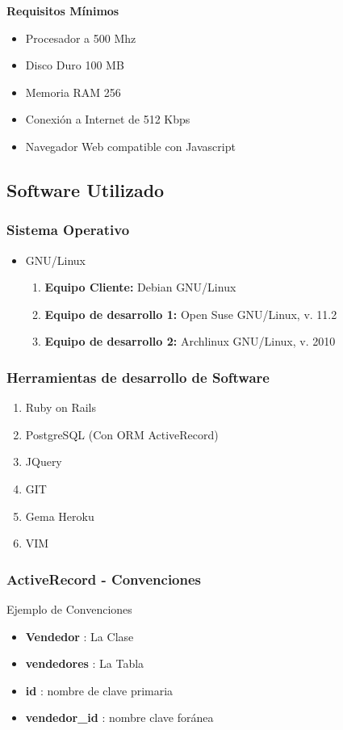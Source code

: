\documentclass{beamer}
\begin{document}
\begin{frame}
\textbf{Requisitos Mínimos}
\begin{itemize}
\item Procesador a 500 Mhz
\item Disco Duro 100 MB
\item Memoria RAM 256
\item Conexión a Internet de 512 Kbps 
\item Navegador Web compatible con Javascript
\end{itemize}
\end{frame}

\subsection{Software Utilizado}

\begin{frame}
\frametitle{Sistema Operativo}
\begin{itemize}
\item GNU/Linux
\begin{enumerate}
\pause
\item \textbf{Equipo Cliente:} Debian GNU/Linux \pause
\item \textbf{Equipo de desarrollo 1:} Open Suse GNU/Linux, v. 11.2 \pause
\item \textbf{Equipo de desarrollo 2:} Archlinux GNU/Linux, v. 2010 \pause
\end{enumerate}
\end{itemize}
\end{frame}

\begin{frame}
\frametitle{Herramientas de desarrollo de Software}
\begin{enumerate}
\pause
\item \alert{Ruby on Rails} \pause
\item \alert{PostgreSQL (Con ORM ActiveRecord)} \pause
\item JQuery \pause
\item GIT \pause
\item Gema Heroku \pause
\item VIM
\end{enumerate}
\end{frame}

\begin{frame}
\frametitle{ActiveRecord - Convenciones}
Ejemplo de Convenciones
\begin{itemize}
\item \textbf{Vendedor} : La Clase
\item \textbf{vendedores} : La Tabla
\item \textbf{id} : nombre de clave primaria 
\item \textbf{vendedor\_id} : nombre clave foránea
\end{itemize}
\end{frame}
\end{document}
